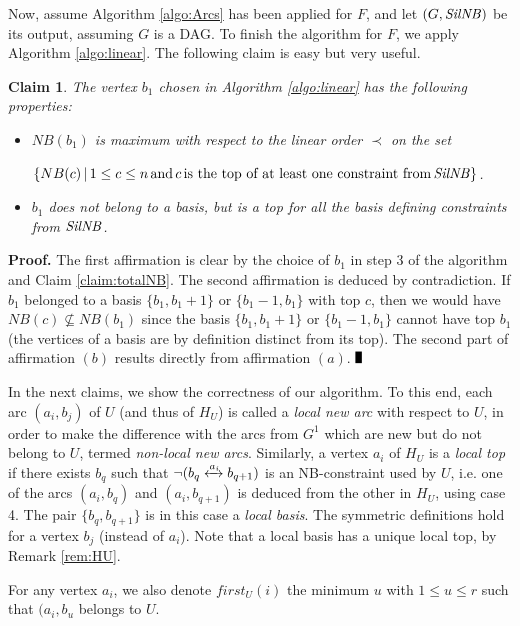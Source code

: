 \documentclass{article}
\newcommand{\lrf}[1]{\xleftrightarrow{#1}}
\newcommand{\Sil}{{\it SilNB}}
\newtheorem{fait}{Claim}
\newcommand{\bfn}{\begin{fait}}
\newcommand{\efn}{\end{fait}}
\renewcommand{\Box}{\rule{1.5mm}{3mm}}
\begin{document}
\bigskip

Now, assume Algorithm \ref{algo:Arcs} has been applied for $F$, and let $(G, \Sil)$ be its output, assuming $G$ is a DAG.
To finish the algorithm for $F$, we apply Algorithm \ref{algo:linear}. The following claim is easy but very useful.

\bfn
The vertex $b_1$ chosen in Algorithm \ref{algo:linear} has the following properties:

\begin{itemize}
\item[$(a)$] $NB(b_1)$ is maximum with respect to the linear order $\prec$ on the set

$\{NB(c)\, |\, 1\leq c\leq n\, \mbox{and}\, c\, \mbox{is the top of at least one constraint from}\, \Sil\}$.
\item[$(b)$] $b_1$ does not belong to a basis, but is a top for all the basis defining constraints from $\Sil$.
\end{itemize}

\label{claim:b1}
\efn

{\bf Proof.} The first affirmation is clear by the choice of $b_1$ in step 3 of the algorithm and 
Claim \ref{claim:totalNB}. The second affirmation is deduced by contradiction. If $b_1$
belonged to a basis $\{b_1,b_1+1\}$ or $\{b_1-1, b_1\}$ with top $c$, then we would have $NB(c)\not\subseteq NB(b_1)$
since the basis $\{b_1,b_1+1\}$ or $\{b_1-1, b_1\}$ cannot have top $b_1$ (the vertices of a basis are by definition distinct from
its top). The second part of affirmation $(b)$ results directly from affirmation $(a)$. $\Box$
\bigskip

In the next claims, we show the correctness of our algorithm.
To this end, each arc $(a_i,b_j)$ of $U$ (and thus of $H_U$) is called a {\em local new arc} 
with respect to $U$,  in order to make the difference with the arcs from $G^1$ which are new but 
do not belong to $U$, termed {\em non-local new arcs}. Similarly, a vertex $a_i$ of $H_U$ is 
a {\em local top} if there  exists $b_q$ such that  
$\neg(b_q\lrf{a_i}b_{q+1})$ is an NB-constraint used by $U$, i.e. one of the arcs $(a_i,b_q)$ and $(a_i, b_{q+1})$
is deduced from the other in $H_U$, using case 4.  The pair $\{b_q,b_{q+1}\}$ is in this case a {\em local basis}. 
The symmetric definitions hold for a vertex $b_j$ (instead of $a_i$). Note that a local basis has a unique local top,
by Remark \ref{rem:HU}.

For any vertex  $a_i$, we also denote $first_U(i)$ the minimum $u$ with $1\leq u\leq r$
such that $(a_i,b_u$ belongs to $U$. 
\end{document}
